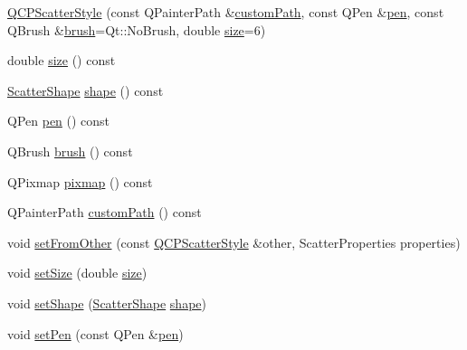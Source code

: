 \begin{DoxyCompactItemize}
\item 
\mbox{\hyperlink{class_q_c_p_scatter_style_a879c30647683b3cfbde2afecea815e6f}{Q\+C\+P\+Scatter\+Style}} (const Q\+Painter\+Path \&\mbox{\hyperlink{class_q_c_p_scatter_style_aef1fac84c9830fd97f2a8568e605e372}{custom\+Path}}, const Q\+Pen \&\mbox{\hyperlink{class_q_c_p_scatter_style_acdd6313d16e69d3810e9d1f48dd9e4bb}{pen}}, const Q\+Brush \&\mbox{\hyperlink{class_q_c_p_scatter_style_adc4f66aed84f1d7a3a5aabf4f48f31a6}{brush}}=Qt\+::\+No\+Brush, double \mbox{\hyperlink{class_q_c_p_scatter_style_a0e94526d9165d9f50e262102bdd71a47}{size}}=6)
\item 
double \mbox{\hyperlink{class_q_c_p_scatter_style_a0e94526d9165d9f50e262102bdd71a47}{size}} () const
\item 
\mbox{\hyperlink{class_q_c_p_scatter_style_adb31525af6b680e6f1b7472e43859349}{Scatter\+Shape}} \mbox{\hyperlink{class_q_c_p_scatter_style_af04cad55bd7f58a96da4fc6bc46a0a1e}{shape}} () const
\item 
Q\+Pen \mbox{\hyperlink{class_q_c_p_scatter_style_acdd6313d16e69d3810e9d1f48dd9e4bb}{pen}} () const
\item 
Q\+Brush \mbox{\hyperlink{class_q_c_p_scatter_style_adc4f66aed84f1d7a3a5aabf4f48f31a6}{brush}} () const
\item 
Q\+Pixmap \mbox{\hyperlink{class_q_c_p_scatter_style_a9b2d1a2ec0aac0c74f7582d14050e93a}{pixmap}} () const
\item 
Q\+Painter\+Path \mbox{\hyperlink{class_q_c_p_scatter_style_aef1fac84c9830fd97f2a8568e605e372}{custom\+Path}} () const
\item 
void \mbox{\hyperlink{class_q_c_p_scatter_style_a7d59ba8864914f765817841089e436f1}{set\+From\+Other}} (const \mbox{\hyperlink{class_q_c_p_scatter_style}{Q\+C\+P\+Scatter\+Style}} \&other, Scatter\+Properties properties)
\item 
void \mbox{\hyperlink{class_q_c_p_scatter_style_aaefdd031052892c4136129db68596e0f}{set\+Size}} (double \mbox{\hyperlink{class_q_c_p_scatter_style_a0e94526d9165d9f50e262102bdd71a47}{size}})
\item 
void \mbox{\hyperlink{class_q_c_p_scatter_style_a7c641c4d4c6d29cb705d3887cfce91c1}{set\+Shape}} (\mbox{\hyperlink{class_q_c_p_scatter_style_adb31525af6b680e6f1b7472e43859349}{Scatter\+Shape}} \mbox{\hyperlink{class_q_c_p_scatter_style_af04cad55bd7f58a96da4fc6bc46a0a1e}{shape}})
\item 
void \mbox{\hyperlink{class_q_c_p_scatter_style_a761f1f229cc0ca4703e1e2b89f6dd1ba}{set\+Pen}} (const Q\+Pen \&\mbox{\hyperlink{class_q_c_p_scatter_style_acdd6313d16e69d3810e9d1f48dd9e4bb}{pen}})

\end{DoxyCompactItemize}
